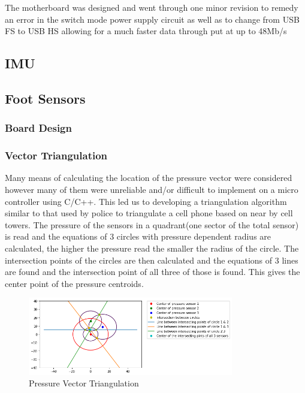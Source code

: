    The motherboard was designed and went through one minor revision to remedy an error in the switch mode power supply circuit as well as to change from USB FS to USB HS allowing for a much faster data  through put at up to 48Mb/s
\subsection{IMU}

\subsection{Foot Sensors}

\subsubsection{Board Design}
\subsubsection{Vector Triangulation}
Many means of calculating the location of the pressure vector were considered however many of them were unreliable and/or difficult to implement on a micro controller using C/C++. This led us to developing a triangulation algorithm similar to that used by police to triangulate a cell phone based on near by cell towers. The pressure of the sensors in a quadrant(one sector of the total sensor) is read and the equations of 3 circles with pressure dependent radius are calculated, the higher the pressure read the smaller the radius of the circle. The intersection points of the circles are then calculated and the equations of 3 lines are found and the intersection point of all three of those is found. This gives the center point of the pressure centroids. 
\begin{figure}[H]
    \centering
    \includegraphics[width=0.8\textwidth]{figures/Triangulation.png}
    \caption{Pressure Vector Triangulation}
    \label{fig:PressureVectorTriangulation}
\end{figure}